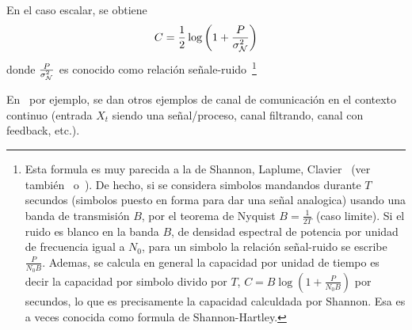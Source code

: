 En   el   caso   escalar,   se   obtiene
%
\[
C = \frac12 \log\left( 1 + \frac{P}{\sigma_{\mathcal{N}}^2} \right)
\]
%
donde     $\frac{P}{\sigma_{\mathcal{N}}^2}$     es     conocido    como     relaci\'on
se\~nale-ruido~\footnote{Esta formula es muy  parecida a la de Shannon, Laplume,
  Clavier~\cite{Sha48,  Lap48,  Cla48} (ver  tambi\'en~\cite[Sec.~9.3]{CovTho06}
  o~\cite[Sec.~11.2]{Rio07}).   De  hecho, si  se  considera simbolos  mandandos
  durante $T$ secundos (simbolos puesto en forma para dar una se\~nal analogica)
  usando  una  banda de  transmisi\'on  $B$,  por el  teorema  de  Nyquist $B  =
  \frac{1}{2  T}$ (caso  limite). Si  el ruido  es blanco  en la  banda  $B$, de
  densidad espectral de potencia por unidad de frecuencia igual a $N_0$, para un
  simbolo la  relaci\'on se\~nal-ruido se escribe $\frac{P}{N_0  B}$. Ademas, se
  calcula en general la capacidad por unidad de tiempo es decir la capacidad por
  simbolo divido por $T$, \ie $C = B \log\left( 1 + \frac{P}{N_0 B} \right)$ por
  secundos, lo que es precisamente  la capacidad calculdada por Shannon.  Esa es
  a veces conocida como formula de Shannon-Hartley.}

En~\cite{CovTho06,  Rio07}  por ejemplo,  se  dan  otros  ejemplos de  canal  de
comunicaci\'on   en   el   contexto   continuo   (entrada   $X_t$   siendo   una
se\~nal/proceso, canal filtrando, canal con feedback, etc.).


\label{sec:SZ:Codificacion}

